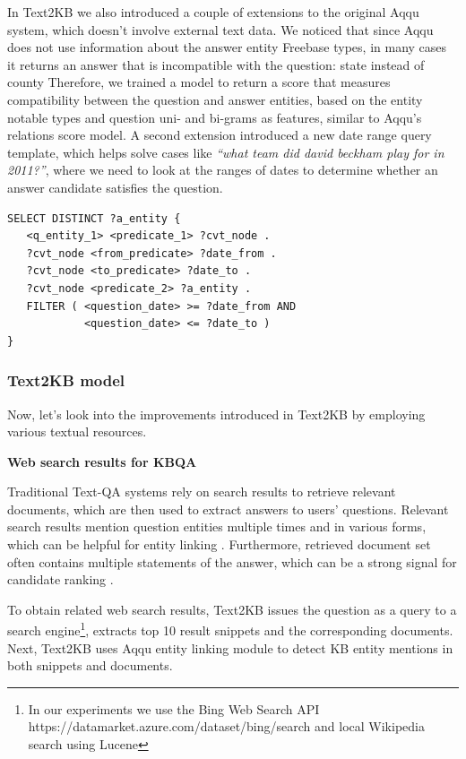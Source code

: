 In Text2KB we also introduced a couple of extensions to the original Aqqu system, which doesn't involve external text data.
We noticed that since Aqqu does not use information about the answer entity Freebase types, in many cases it returns an answer that is incompatible with the question: \eg state instead of county \etc
Therefore, we trained a model to return a score that measures compatibility between the question and answer entities, based on the entity notable types and question uni- and bi-grams as features, similar to Aqqu's relations score model.
A second extension introduced a new date range query template, which helps solve cases like \textit{``what team did david beckham play for in 2011?''}, where we need to look at the ranges of dates to determine whether an answer candidate satisfies the question.

\begin{lstlisting}[frame=single,basicstyle=\small]
SELECT DISTINCT ?a_entity {
   <q_entity_1> <predicate_1> ?cvt_node .
   ?cvt_node <from_predicate> ?date_from .
   ?cvt_node <to_predicate> ?date_to .
   ?cvt_node <predicate_2> ?a_entity .
   FILTER ( <question_date> >= ?date_from AND
            <question_date> <= ?date_to )
}
\end{lstlisting}

\subsubsection{Text2KB model}
\label{section:factoid:approaches:text2kb:model}

Now, let's look into the improvements introduced in Text2KB by employing various textual resources.

\textbf{Web search results for KBQA}

Traditional Text-QA systems rely on search results to retrieve relevant documents, which are then used to extract answers to users' questions.
Relevant search results mention question entities multiple times and in various forms, which can be helpful for entity linking \cite{SMAPH_ERD:2014}.
Furthermore, retrieved document set often contains multiple statements of the answer, which can be a strong signal for candidate ranking \cite{lin2007exploration}.

To obtain related web search results, Text2KB issues the question as a query to a search engine\footnote{In our experiments we use the Bing Web Search API https://datamarket.azure.com/dataset/bing/search and local Wikipedia search using Lucene}, extracts top 10 result snippets and the corresponding documents.
Next, Text2KB uses Aqqu entity linking module to detect KB entity mentions in both snippets and documents.

